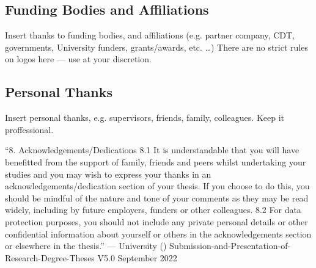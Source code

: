 
\subsection*{Funding Bodies and Affiliations}
Insert thanks to funding bodies, and affiliations (e.g. partner company, CDT, governments, University funders, grants/awards, etc. \ldots) There are no strict rules on logos here --- use at your discretion. 

\subsection*{Personal Thanks}
Insert personal thanks, e.g. supervisors, friends, family, colleagues. Keep it proffessional.

``8. Acknowledgements/Dedications
8.1 It is understandable that you will have benefitted from the support of family, friends and peers whilst undertaking your studies and you may wish to express your thanks in an acknowledgements/dedication section of your thesis. If you choose to do this, you should be mindful of the nature and tone of your comments as they may be read widely, including by future employers, funders or other colleagues.
8.2 For data protection purposes, you should not include any private personal details or other confidential information about yourself or others in the acknowledgements section or elsewhere in the thesis.'' --- University () Submission-and-Presentation-of-Research-Degree-Theses V5.0 September 2022